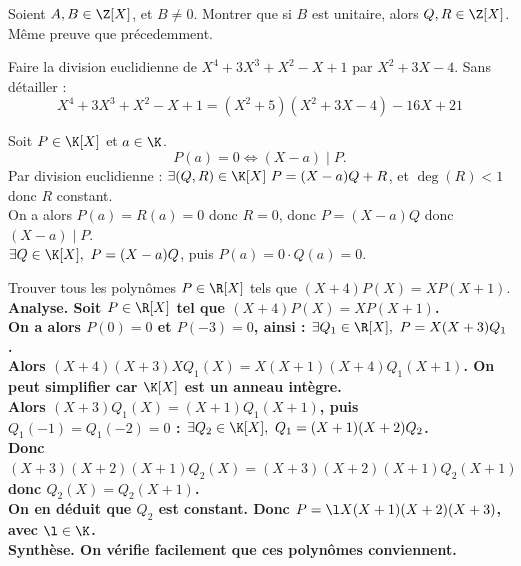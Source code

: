 \documentclass[11pt]{article}
\begin{document}
\vspace*{-0.7cm}

\begin{exi}{}{}
    Soient $A,B\in\Z[X]$, et $B\neq0$. Montrer que si $B$ est unitaire, alors $Q,R\in\Z[X]$.
    \tcblower
    Même preuve que précedemment.
\end{exi}

\vspace*{-0.7cm}

\begin{ex}{}{}
    Faire la division euclidienne de $X^4+3X^3+X^2-X+1$ par $X^2+3X-4$.
    \tcblower
    Sans détailler :
    \begin{equation*}
        X^4+3X^3+X^2-X+1=(X^2+5)(X^2+3X-4)-16X+21
    \end{equation*}
\end{ex}

\begin{prop}{}{}
    Soit $P\in\K[X]$ et $a\in\K$.
    \begin{equation*}
        P(a) = 0 \iff (X-a) \mid P.
    \end{equation*}
    \tcblower
    \boxed{\ra} Par division euclidienne : $\exists (Q,R)\in\K[X] ~ P=(X-a)Q+R$, et $\deg(R)<1$ donc $R$ constant.\\
    On a alors $P(a)=R(a)=0$ donc $R=0$, donc $P=(X-a)Q$ donc $(X-a) \mid P$.\\ 
    \boxed{\la} $\exists Q \in \K[X], ~ P=(X-a)Q$, puis $P(a)=0\cdot Q(a)=0$.
\end{prop}

\vspace*{-0.7cm}

\begin{ex}{}{}
    Trouver tous les polynômes $P\in\R[X]$ tels que $(X+4)P(X)=XP(X+1)$.
    \tcblower
    \bf{Analyse.} Soit $P\in\R[X]$ tel que $(X+4)P(X)=XP(X+1)$.\\
    On a alors $P(0)=0$ et $P(-3)=0$, ainsi : $\exists Q_1 \in \R[X], ~ P=X(X+3)Q_1$.\\
    Alors $(X+4)(X+3)XQ_1(X)=X(X+1)(X+4)Q_1(X+1)$. On peut simplifier car $\K[X]$ est un anneau intègre.\\
    Alors $(X+3)Q_1(X)=(X+1)Q_1(X+1)$, puis $Q_1(-1)=Q_1(-2)=0$ : $\exists Q_2\in\K[X], ~ Q_1=(X+1)(X+2)Q_2$.\\
    Donc $(X+3)(X+2)(X+1)Q_2(X)=(X+3)(X+2)(X+1)Q_2(X+1)$ donc $Q_2(X)=Q_2(X+1)$.\\
    On en déduit que $Q_2$ est constant. Donc $P=\l X(X+1)(X+2)(X+3)$, avec $\l\in\K$.\\
    \bf{Synthèse.} On vérifie facilement que ces polynômes conviennent.
\end{ex}
\end{document}
